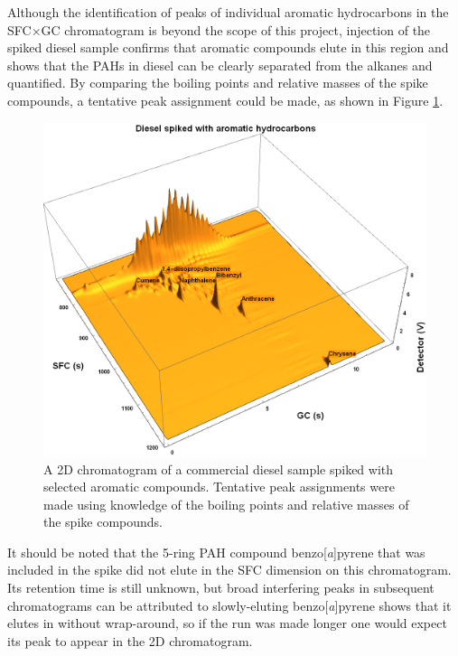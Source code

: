Although the identification of peaks of individual aromatic hydrocarbons in the
SFC×GC chromatogram is beyond the scope of this project, injection of the spiked
diesel sample confirms that aromatic compounds elute in this region and shows
that the PAHs in diesel can be clearly separated from the alkanes and
quantified. By comparing the boiling points and relative masses of the spike
compounds, a tentative peak assignment could be made, as shown in Figure
\ref{fig:Spiked_Diesel_Annotated}.

\begin{figure}
	\centering
	\includegraphics[width=\textwidth]{Figures/Spiked_Diesel_Annotated.png}
	\decoRule	
	
\caption[Peak assignment in spiked diesel sample.]{A 2D chromatogram of a
commercial diesel sample spiked with selected aromatic compounds. Tentative peak
assignments were made using knowledge of the boiling points and relative masses
of the spike compounds.}

	\label{fig:Spiked_Diesel_Annotated} 
\end{figure}

It should be noted that the 5-ring PAH compound benzo[\textit{a}]pyrene that was
included in the spike did not elute in the SFC dimension on this chromatogram.
Its \oneD retention time is still unknown, but broad interfering peaks in
subsequent chromatograms can be attributed to slowly-eluting
benzo[\textit{a}]pyrene shows that it elutes in \twoD without wrap-around, so if
the \oneD run was made longer one would expect its peak to appear in the 2D
chromatogram.

